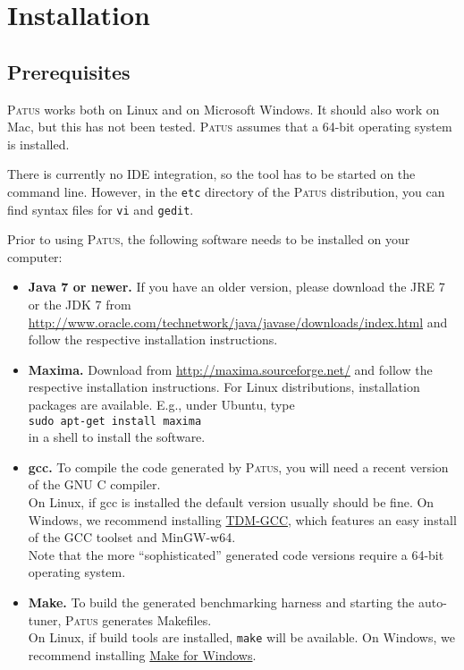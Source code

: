 \section{Installation}

\subsection{Prerequisites}

\textsc{Patus} works both on Linux and on Microsoft Windows.
It should also work on Mac, but this has not been tested.
\textsc{Patus} assumes that a 64-bit operating system is installed.

There is currently no IDE integration, so the tool has to be started on the command line.
However, in the \texttt{etc} directory of the \textsc{Patus} distribution, you can find syntax files
for \texttt{vi} and \texttt{gedit}.

Prior to using \textsc{Patus}, the following software needs to be installed on your computer:

\begin{itemize}
  \item \textbf{Java 7 or newer.} If you have an older version, please download the JRE 7 or the JDK 7
    from \url{http://www.oracle.com/technetwork/java/javase/downloads/index.html} and follow the
    respective installation instructions.
    
  \item \textbf{Maxima.} Download from \url{http://maxima.sourceforge.net/} and follow the respective
    installation instructions. For Linux distributions, installation packages are available.
    E.g., under Ubuntu, type\\
    \texttt{\phantom{XXXX}sudo apt-get install maxima}\\
    in a shell to install the software.
    
  \item \textbf{gcc.} To compile the code generated by \textsc{Patus}, you will need a recent version
    of the GNU C compiler.\\
    On Linux, if gcc is installed the default version usually should be fine.
    On Windows, we recommend installing \href{http://tdm-gcc.tdragon.net/}{TDM-GCC}, which features
    an easy install of the GCC toolset and MinGW-w64.\\
    Note that the more ``sophisticated'' generated code versions require a 64-bit operating system.
    
  \item \textbf{Make.} To build the generated benchmarking harness and starting the
    auto-tuner, \textsc{Patus} generates Makefiles.\\
    On Linux, if build tools are installed, \texttt{make} will be available.
    On Windows, we recommend installing \href{http://gnuwin32.sourceforge.net/packages/make.htm}{Make for Windows}.
\end{itemize}


